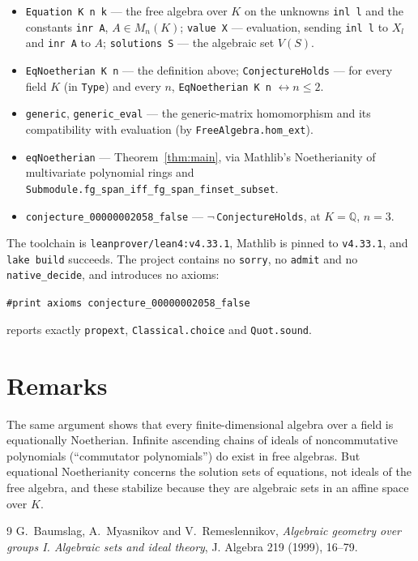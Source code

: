 \documentclass[11pt]{article}
\theoremstyle{plain}
\theoremstyle{definition}
\theoremstyle{remark}
\begin{document}
\begin{itemize}
  \item \texttt{Equation K n k} --- the free algebra over $K$ on the unknowns
    \texttt{inl l} and the constants \texttt{inr A}, $A\in M_n(K)$;
    \texttt{value X} --- evaluation, sending \texttt{inl l} to $X_l$ and
    \texttt{inr A} to $A$; \texttt{solutions S} --- the algebraic set $V(S)$.
  \item \texttt{EqNoetherian K n} --- the definition above;
    \texttt{ConjectureHolds} --- for every field $K$ (in \texttt{Type}) and
    every $n$, \texttt{EqNoetherian K n} $\leftrightarrow n\le2$.
  \item \texttt{generic}, \texttt{generic\_eval} --- the generic-matrix
    homomorphism and its compatibility with evaluation (by
    \texttt{FreeAlgebra.hom\_ext}).
  \item \texttt{eqNoetherian} --- Theorem~\ref{thm:main}, via Mathlib's
    Noetherianity of multivariate polynomial rings and
    \texttt{Submodule.fg\_span\_iff\_fg\_span\_finset\_subset}.
  \item \texttt{conjecture\_00000002058\_false} --- $\lnot\,$\texttt{ConjectureHolds},
    at $K=\mathbb Q$, $n=3$.
\end{itemize}

The toolchain is \texttt{leanprover/lean4:v4.33.1}, Mathlib is pinned to
\texttt{v4.33.1}, and \texttt{lake build} succeeds. The project contains no
\texttt{sorry}, no \texttt{admit} and no \texttt{native\_decide}, and
introduces no axioms:
\begin{center}
\texttt{\#print axioms conjecture\_00000002058\_false}
\end{center}
reports exactly \texttt{propext}, \texttt{Classical.choice} and
\texttt{Quot.sound}.

\section{Remarks}

The same argument shows that every finite-dimensional algebra over a field is
equationally Noetherian. Infinite ascending chains of ideals of
noncommutative polynomials (``commutator polynomials'') do exist in free
algebras. But equational Noetherianity concerns the solution sets of
equations, not ideals of the free algebra, and these stabilize because they are
algebraic sets in an affine space over $K$.

\begin{thebibliography}{9}
 G.~Baumslag, A.~Myasnikov and V.~Remeslennikov, \emph{Algebraic
  geometry over groups I. Algebraic sets and ideal theory}, J. Algebra 219
  (1999), 16--79.
\end{thebibliography}
\end{document}
